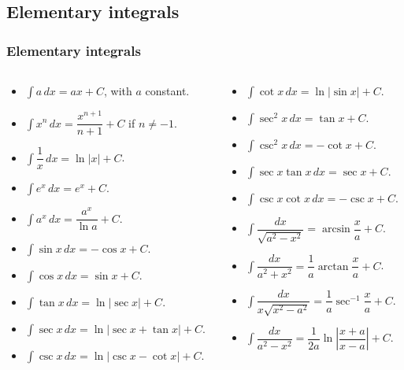 \subsection{Elementary integrals}
\begin{frame}
\frametitle{Elementary integrals}
\begin{columns}
\begin{column}{0.5\textwidth}
\begin{itemize}
\item $\int a\,dx=ax+C$, with $a$ constant.
\item $\int x^n\,dx=\dfrac{x^{n+1}}{n+1}+C$ \quad if $n\neq -1$.
\item $\int \dfrac{1}{x}\, dx=\ln|x|+C$.
\item $\int e^x\,dx=e^x+C$.
\item $\int a^x\,dx=\dfrac{a^x}{\ln a}+C$.
\item $\int \sin x\, dx=-\cos x+C$.
\item $\int \cos x\, dx=\sin x+C$.
\item $\int \tan x\, dx=\ln|\sec x|+C$.
\item $\int \sec x\, dx = \ln|\sec x + \tan x|+C$.
\item $\int \csc x\, dx= \ln|\csc x-\cot x|+C$.
\end{itemize}
\end{column}
\begin{column}{0.5\textwidth}
\begin{itemize}
\item $\int \cot x \, dx= \ln|\sin x|+C$.
\item $\int \sec^2 x\, dx= \tan x+ C$.
\item $\int \csc^2 x\, dx= -\cot x+ C$.
\item $\int \sec x \tan x\, dx= \sec x+ C$.
\item $\int \csc x \cot x\, dx = -\csc x +C$.
\item $\int \dfrac{dx}{\sqrt{a^2-x^2}}=\arcsin\dfrac{x}{a}+C$.
\item $\int \dfrac{dx}{a^2+x^2}=\dfrac{1}{a}\arctan\dfrac{x}{a}+C$.
\item $\int \dfrac{dx}{x\sqrt{x^2-a^2}}=\dfrac{1}{a}\sec^{-1}\dfrac{x}{a}+C$.
\item $\int \dfrac{dx}{a^2-x^2}=\dfrac{1}{2a}\ln|\dfrac{x+a}{x-a}|+C$.
\end{itemize}
\end{column}
\end{columns}
\end{frame}


